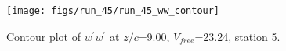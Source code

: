 \begin{figure}[H]
\centering
\texttt{[image: figs/run\_45/run\_45\_ww\_contour]}
\caption{Contour plot of $\overline{w^\prime w^\prime}$ at $z/c$=9.00, $V_{free}$=23.24, station 5.}
\label{fig:run_45_ww_contour}
\end{figure}


